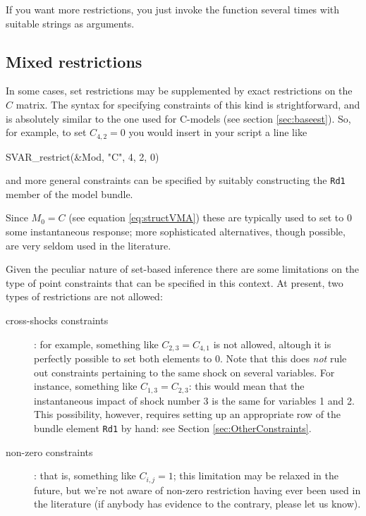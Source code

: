 \documentclass[a4paper,10pt]{article}
\newcounter{script}[section]
\begin{document}
If you want more restrictions, you just invoke the function several times
with suitable strings as arguments.


\subsection{Mixed restrictions}
\label{sec:mixed}

In some cases, set restrictions may be supplemented by exact restrictions on the
$C$ matrix. The syntax for specifying constraints of this kind is
strightforward, and is absolutely similar to the one used for C-models (see
section \ref{sec:baseest}). So, for example, to set $C_{4,2} = 0$ you would
insert in your script a line like
\begin{code}
  SVAR_restrict(&Mod, "C", 4, 2, 0)
\end{code}
and more general constraints can be specified by suitably constructing the
\texttt{Rd1} member of the model bundle.

Since $M_0 = C$ (see equation \ref{eq:structVMA}) these are typically used to
set to 0 some instantaneous response; more sophisticated alternatives, though
possible, are very seldom used in the literature.

Given the peculiar nature of set-based inference there are some limitations on
the type of point constraints that can be specified in this context. At present,
two types of restrictions are not allowed:
\begin{description}
\item[cross-shocks constraints]: for example, something like
  $C_{2,3} = C_{4,1}$ is not allowed, altough it is perfectly
  possible to set both elements to 0. Note that this does \emph{not}
  rule out constraints pertaining to the same shock on several
  variables. For instance, something like $C_{1,3} = C_{2,3}$: this
  would mean that the instantaneous impact of shock number 3 is the
  same for variables 1 and 2. This possibility, however, requires
  setting up an appropriate row of the bundle element \texttt{Rd1} by
  hand: see Section \ref{sec:OtherConstraints}.
\item[non-zero constraints]: that is, something like $C_{i,j} = 1$; this
  limitation may be relaxed in the future, but we're not aware of
  non-zero restriction having ever been used in the literature (if
  anybody has evidence to the contrary, please let us know).
\end{description}
\end{document}
